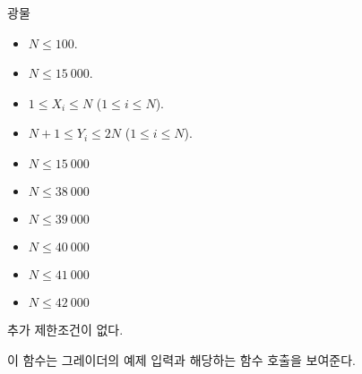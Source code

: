 \begin{problem}{광물}
	\begin{itemize}
		\item $N \le 100$.
	\end{itemize}
	
	\begin{itemize}
		\item $N \le 15\ 000$.
		\item $1 \le X_i \le N$ ($1 \le i \le N$).
		\item $N+1 \le Y_i \le 2N$ ($1 \le i\le N$).
	\end{itemize}
	
	\begin{itemize}
		\item $N \le 15\ 000$
	\end{itemize}

	\begin{itemize}
		\item $N \le 38\ 000$
	\end{itemize}
	
	\begin{itemize}
		\item $N \le 39\ 000$
	\end{itemize}
	
	\begin{itemize}
		\item $N \le 40\ 000$
	\end{itemize}
	
	\begin{itemize}
		\item $N \le 41\ 000$
	\end{itemize}
	
	\begin{itemize}
		\item $N \le 42\ 000$
	\end{itemize}
	
	
	
	추가 제한조건이 없다.
	
	\Examples
	
	이 함수는 그레이더의 예제 입력과 해당하는 함수 호출을 보여준다.
	

\end{problem}
